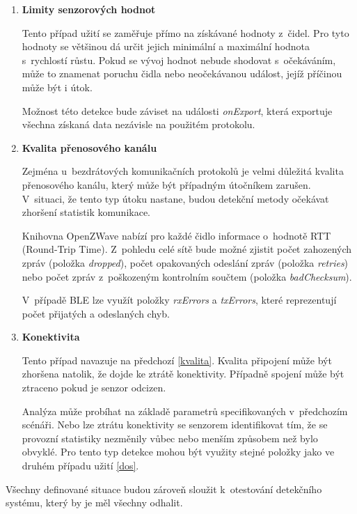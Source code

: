 \begin{enumerate}
    \item \textbf{Limity senzorových hodnot}
    
    Tento případ užití se zaměřuje přímo na získávané hodnoty z~čidel. Pro tyto hodnoty se většinou
    dá určit jejich minimální a maximální hodnota s~rychlostí růstu. Pokud se vývoj hodnot nebude 
    shodovat s~očekáváním, může to znamenat poruchu čidla nebo neočekávanou událost, jejíž příčinou 
    může být i útok.
    
    Možnost této detekce bude záviset na události \textit{onExport}, která exportuje všechna
    získaná data nezávisle na použitém protokolu.
    
    \item \textbf{Kvalita přenosového kanálu} \label{kvalita}
    
    Zejména u~bezdrátových komunikačních protokolů je velmi důležitá kvalita přenosového kanálu,
    který může být případným útočníkem zarušen. V~situaci, že tento typ útoku nastane, budou 
    detekční metody očekávat zhoršení statistik komunikace. 
    
    Knihovna OpenZWave nabízí pro každé čidlo informace o~hodnotě RTT (Round-Trip Time). Z~pohledu 
    celé sítě bude možné zjistit počet zahozených zpráv (položka \textit{dropped}), počet
    opakovaných odeslání zpráv (položka \textit{retries}) nebo počet zpráv z~poškozeným kontrolním
    součtem (položka \textit{badChecksum}).
    
    V~případě BLE lze využít položky \textit{rxErrors} a \textit{txErrors}, které reprezentují
    počet přijatých a odeslaných chyb.
    
    \item \textbf{Konektivita}
    
    Tento případ navazuje na předchozí \ref{kvalita}. Kvalita připojení může být zhoršena natolik, že dojde 
    ke ztrátě konektivity. Případně spojení může být ztraceno pokud je senzor odcizen. 
    
    Analýza může probíhat na základě parametrů specifikovaných v~předchozím scénáři. Nebo lze 
    ztrátu konektivity se senzorem identifikovat tím, že se provozní statistiky nezměnily vůbec nebo
    menším způsobem než bylo obvyklé. Pro tento typ detekce mohou být využity stejné položky
    jako ve druhém případu užití \ref{dos}.
    
   \end{enumerate}

  Všechny definované situace budou zároveň sloužit k~otestování detekčního systému, který by je
  měl všechny odhalit.